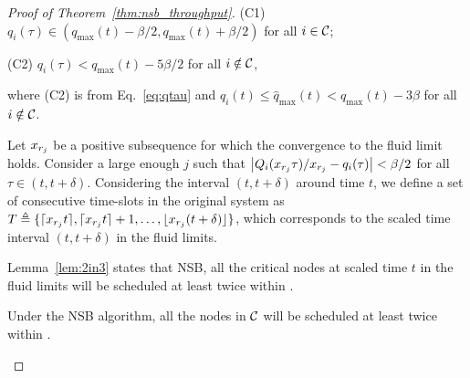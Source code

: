 \documentclass[10pt,journal,compsoc]{IEEEtran}
\newcommand{\high}[1]{{\color{black}{#1}}}
\begin{document}
\begin{proof}[Proof of Theorem~\ref{thm:nsb_throughput}]
{(C1) $q_i(\tau) \in (q_{\max}(t)-\beta/2, q_{\max}(t)+\beta/2)$ for all $i \in \mathcal{C}$;

(C2) $q_i(\tau) < q_{\max}(t)-5\beta/2$ for all $i \notin \mathcal{C}$,

\noindent where (C2) is from Eq.~\eqref{eq:qtau} and $q_i(t) \le \hat{q}_{\max}(t)<q_{\max}(t) - 3 \beta$ for all $i \notin \mathcal{C}$.
}

Let ${x_{r_j}}$ be a positive subsequence for which the convergence to the fluid limit holds.
Consider a large enough $j$ such that $\left \lvert Q_i({x_{r_j}} \tau)/{x_{r_j}} - q_i(\tau) \right \rvert < \beta/2$ 
for all $\tau \in (t,t+\delta)$.
Considering the interval $(t,t+\delta)$ around time $t$, we define a set of consecutive
time-slots in the original system as
$T \triangleq \{\lceil {x_{r_j}} t \rceil, \lceil {x_{r_j}} t \rceil + 1, \dots, \lfloor {x_{r_j}} (t+\delta) \rfloor\}$,
which corresponds to the scaled time interval $(t,t+\delta)$ in the fluid limits.

Lemma~\ref{lem:2in3} states that NSB, all the critical nodes at scaled time $t$ in the fluid 
limits will be scheduled at least twice within \high{each frame of interval $T$}. 

\begin{lemma}
\label{lem:2in3}
Under the NSB algorithm, all the nodes in $\mathcal{C}$ will be scheduled at least twice within 
\high{each frame of interval $T$}.
\end{lemma}


\end{proof}
\end{document}
